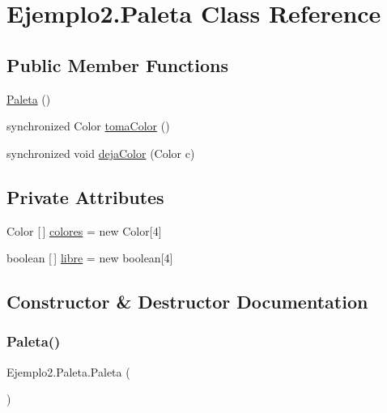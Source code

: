 \hypertarget{class_ejemplo2_1_1_paleta}{}\section{Ejemplo2.\+Paleta Class Reference}
\label{class_ejemplo2_1_1_paleta}
\subsection*{Public Member Functions}
\begin{DoxyCompactItemize}
\item 
\mbox{\hyperlink{class_ejemplo2_1_1_paleta_ab67b7dd37970789097439eabc3d7407b}{Paleta}} ()
\item 
synchronized Color \mbox{\hyperlink{class_ejemplo2_1_1_paleta_a4b360ca77c1d02b9c06f5211effa22a0}{toma\+Color}} ()
\item 
synchronized void \mbox{\hyperlink{class_ejemplo2_1_1_paleta_abe11e44a413ddff63a5758f67ace794b}{deja\+Color}} (Color c)
\end{DoxyCompactItemize}
\subsection*{Private Attributes}
\begin{DoxyCompactItemize}
\item 
Color \mbox{[}$\,$\mbox{]} \mbox{\hyperlink{class_ejemplo2_1_1_paleta_ab6636b274dbb3f89739e635922ff7a75}{colores}} = new Color\mbox{[}4\mbox{]}
\item 
boolean \mbox{[}$\,$\mbox{]} \mbox{\hyperlink{class_ejemplo2_1_1_paleta_adb1708f360271b4d7c24a09aeed31f29}{libre}} = new boolean\mbox{[}4\mbox{]}
\end{DoxyCompactItemize}


\subsection{Constructor \& Destructor Documentation}
\mbox{\label{class_ejemplo2_1_1_paleta_ab67b7dd37970789097439eabc3d7407b}} 
\subsubsection{\texorpdfstring{Paleta()}{Paleta()}}
{\footnotesize\ttfamily Ejemplo2.\+Paleta.\+Paleta (\begin{DoxyParamCaption}{ }\end{DoxyParamCaption})\hspace{0.3cm}{\ttfamily [inline]}}


